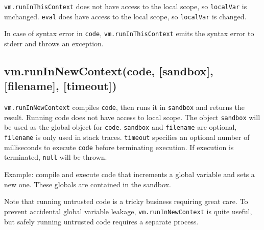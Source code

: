 \texttt{vm.runInThisContext} does not have access to the local scope, so
\texttt{localVar} is unchanged. \texttt{eval} does have access to the
local scope, so \texttt{localVar} is changed.

In case of syntax error in \texttt{code}, \texttt{vm.runInThisContext}
emits the syntax error to stderr and throws an exception.

\subsection{vm.runInNewContext(code, {[}sandbox{]}, {[}filename{]},
{[}timeout{]})}

\texttt{vm.runInNewContext} compiles \texttt{code}, then runs it in
\texttt{sandbox} and returns the result. Running code does not have
access to local scope. The object \texttt{sandbox} will be used as the
global object for \texttt{code}. \texttt{sandbox} and \texttt{filename}
are optional, \texttt{filename} is only used in stack traces.
\texttt{timeout} specifies an optional number of milliseconds to execute
\texttt{code} before terminating execution. If execution is terminated,
\texttt{null} will be thrown.

Example: compile and execute code that increments a global variable and
sets a new one. These globals are contained in the sandbox.

\begin{Shaded}
\begin{Highlighting}[]
 \NormalTok{),}
    \NormalTok{),}
      \NormalTok{: }\NormalTok{,}
      \NormalTok{: }
    \NormalTok{\};}

\NormalTok{(}\NormalTok{);}
\NormalTok{(}

\end{Highlighting}
\end{Shaded}

Note that running untrusted code is a tricky business requiring great
care. To prevent accidental global variable leakage,
\texttt{vm.runInNewContext} is quite useful, but safely running
untrusted code requires a separate process.

